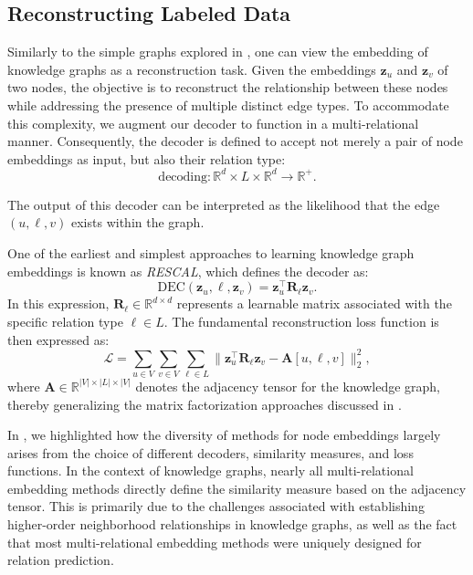 \subsection{Reconstructing Labeled Data}
Similarly to the simple graphs explored in , one can view the embedding of knowledge graphs as a reconstruction task. Given the embeddings $ \mathbf{z}_u $ and $ \mathbf{z}_v $ of two nodes, the objective is to reconstruct the relationship between these nodes while addressing the presence of multiple distinct edge types. To accommodate this complexity, we augment our decoder to function in a multi-relational manner. Consequently, the decoder is defined to accept not merely a pair of node embeddings as input, but also their relation type:
\begin{equation*}
    \text{decoding}: \mathbb{R}^d \times L \times \mathbb{R}^d \to \mathbb{R}^+.
\end{equation*}

The output of this decoder can be interpreted as the likelihood that the edge $ (u,\ell,v) $ exists within the graph.

One of the earliest and simplest approaches to learning knowledge graph embeddings is known as \textit{RESCAL}, which defines the decoder as:
\begin{equation}\label{eq:RESCAL}
    \text{DEC}(\mathbf{z}_u, \ell, \mathbf{z}_v) = \mathbf{z}_u^\top \mathbf{R}_\ell \mathbf{z}_v.
\end{equation}
In this expression, $ \mathbf{R}_\ell\in \mathbb{R}^{d\times d} $ represents a learnable matrix associated with the specific relation type $ \ell\in L $. The fundamental reconstruction loss function is then expressed as:
\begin{equation}\label{eq:reconstructionLossMulti}
    \mathcal{L} = \sum_{u\in V}\sum_{v\in V}\sum_{\ell\in L} \|\mathbf{z}_u^\top \mathbf{R}_\ell \mathbf{z}_v - \mathbf{A}[u,\ell,v]\|_2^2,
\end{equation}
where $ \mathbf{A}\in\mathbb{R}^{|V|\times|L|\times|V|} $ denotes the adjacency tensor for the knowledge graph, thereby generalizing the matrix factorization approaches discussed in .

\medskip
In , we highlighted how the diversity of methods for node embeddings largely arises from the choice of different decoders, similarity measures, and loss functions. In the context of knowledge graphs, nearly all multi-relational embedding methods directly define the similarity measure based on the adjacency tensor. This is primarily due to the challenges associated with establishing higher-order neighborhood relationships in knowledge graphs, as well as the fact that most multi-relational embedding methods were uniquely designed for relation prediction.

